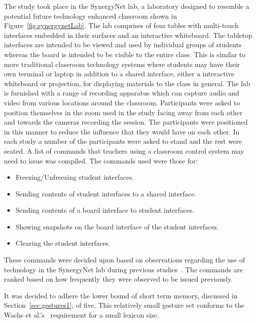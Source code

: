 \documentclass[manuscript, review, screen]{acmart}
\begin{document}
The study took place in the SynergyNet lab, a laboratory designed to resemble a potential future technology enhanced classroom shown in Figure~\ref{fig:synergynetLab}.
The lab comprises of four tables with multi-touch interfaces embedded in their surfaces and an interactive whiteboard. 
The tabletop interfaces are intended to be viewed and used by individual groups of students whereas the board is intended to be visible to the entire class.
This is similar to more traditional classroom technology systems where students may have their own terminal or laptop in addition to a shared interface, either a interactive whiteboard or projection, for displaying materials to the class in general.
The lab is furnished with a range of recording apparatus which can capture audio and video from various locations around the classroom.
Participants were asked to position themselves in the room used in the study facing away from each other and towards the cameras recording the session.
The participants were positioned in this manner to reduce the influence that they would have on each other.
In each study a number of the participants were asked to stand and the rest were seated.
A list of commands that teachers using a classroom control system may need to issue was compiled.
The commands used were those for: 
\begin{itemize}
\item Freezing/Unfreezing student interfaces.
\item Sending contents of student interfaces to a shared interface.
\item Sending contents of a board interface to student interfaces.
\item Showing snapshots on the board interface of the student interfaces.
\item Clearing the student interfaces.\\
\end{itemize}

These commands were decided upon based on observations regarding the use of technology in the SynergyNet lab during previous studies~\cite{Hatch2011}.
The commands are ranked based on how frequently they were observed to be issued previously.

It was decided to adhere the lower bound of short term memory, discussed in Section~\ref{sec:gestures1}, of five.
This relatively small gesture set conforms to the Wachs et al.'s~\citeyearpar{Wachs2011} requirement for a small lexicon size.
\end{document}
